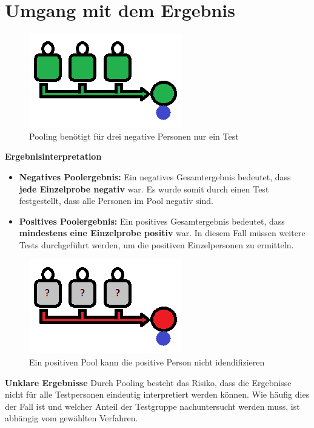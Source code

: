 \section{Umgang mit dem Ergebnis}
\begin{figure}
	\includegraphics[width=.4\textwidth]{img/PoolAlleNegativ}
	\caption{Pooling benötigt für drei negative Personen nur ein Test}
\end{figure}
\textbf{Ergebnisinterpretation}
\begin{itemize}
	\item \textbf{Negatives Poolergebnis:}\newline
	Ein negatives Gesamtergebnis bedeutet, dass \textbf{jede Einzelprobe negativ} war.
	Es wurde somit durch einen Test festgestellt, dass alle Personen im Pool negativ sind.
		
	\item \textbf{Positives Poolergebnis:}\newline
	Ein positives Gesamtergebnis bedeutet, dass \textbf{mindestens eine Einzelprobe positiv} war.
	In diesem Fall müssen weitere Tests durchgeführt werden, um die positiven Einzelpersonen zu ermitteln.

\end{itemize}

\begin{figure}
	\includegraphics[width=.4\textwidth]{img/PoolPositiv}
	\caption{Ein positiven Pool kann die positive Person nicht idendifizieren}
\end{figure}
\textbf{Unklare Ergebnisse}\newline
Durch Pooling besteht das Risiko, dass die Ergebnisse nicht für alle Testpersonen eindeutig interpretiert werden können.
Wie häufig dies der Fall ist und welcher Anteil der Testgruppe nachuntersucht werden muss, ist abhängig vom gewählten Verfahren.

